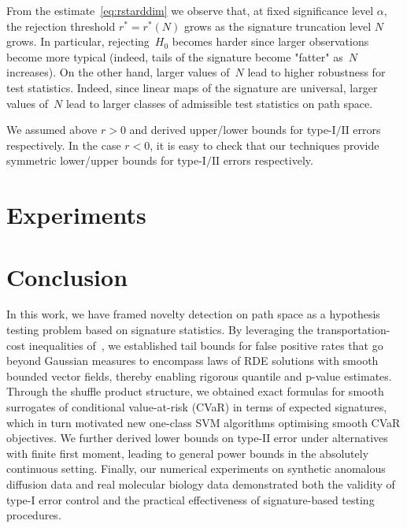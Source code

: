\documentclass[twoside,11pt]{article}
\numberwithin{equation}{section}
\numberwithin{theorem}{section}
\begin{document}
\begin{remark}
From the estimate~\eqref{eq:rstarddim} we observe that, at fixed significance level $\alpha$, the rejection threshold $r^*=r^*(N)$ grows as the signature truncation level $N$ grows. In particular, rejecting~$H_0$ becomes harder since larger observations become more typical (indeed, tails of the signature become "fatter" as~$N$ increases). On the other hand, larger values of~$N$ lead to higher robustness for test statistics. Indeed, since linear maps of the signature are universal, larger values of~$N$ lead to larger classes of admissible test statistics on path space.
\end{remark} 

\begin{remark}\label{rem:rnegative}
We assumed above $r>0$ and derived upper/lower bounds for type-$\mathrm{I}/\mathrm{II}$ errors respectively. 
In the case $r<0$, it is easy to check that our techniques provide symmetric  lower/upper bounds for type-$\mathrm{I}/\mathrm{II}$ errors respectively.
\end{remark}

\section{Experiments}


\section{Conclusion}

In this work, we have framed novelty detection on path space as a hypothesis testing problem based on signature statistics. By leveraging the transportation-cost inequalities of~\citet{gasteratos2023transportation}, we established tail bounds for false positive rates that go beyond Gaussian measures to encompass laws of RDE solutions with smooth bounded vector fields, thereby enabling rigorous quantile and p-value estimates. Through the shuffle product structure, we obtained exact formulas for smooth surrogates of conditional value-at-risk (CVaR) in terms of expected signatures, which in turn motivated new one-class SVM algorithms optimising smooth CVaR objectives. We further derived lower bounds on type-$\mathrm{II}$ error under alternatives with finite first moment, leading to general power bounds in the absolutely continuous setting. Finally, our numerical experiments on synthetic anomalous diffusion data and real molecular biology data demonstrated both the validity of type-$\mathrm{I}$ error control and the practical effectiveness of signature-based testing procedures.
\end{document}
